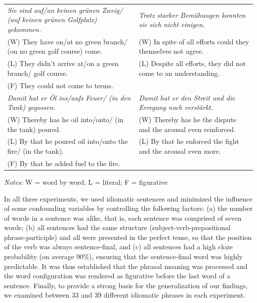 \begin{table}[]
{\begin{tabular}{|p{4in}|p{4in}|}
\textit{Sie sind auf/an keinen grünen Zweig/ (auf keinen grünen Golfplatz) gekommen.} & \textit{Trotz starker Bemühungen konnten sie sich nicht einigen.} \\
\hspace{3mm}(W) They have on/at no green branch/ (on no green golf course) come.                  & \hspace{3mm}(W) In spite of all efforts could they themselves not agree.      \\
\hspace{3mm}(L) They didn’t arrive at/on a green branch/ golf course.                             & \hspace{3mm}(L) Despite all efforts, they did not come to an understanding.   \\
\hspace{3mm}(F) They could not come to terms.                                                     &                                                                   \\ \hline
\textit{Damit hat er Öl ins/aufs Feuer/ (in den Tank) gegossen.}                      & \textit{Damit hat er den Streit und die Erregung noch verstärkt.} \\
\hspace{3mm}(W) Thereby has he oil into/onto/ (in the tank) poured.                               & \hspace{3mm}(W) Thereby has he the dispute and the arousal even reinforced.   \\
\hspace{3mm}(L) By that he poured oil into/onto the fire/ (in the tank).                          & \hspace{3mm}(L) By that he enforced the fight and the arousal even more.      \\
\hspace{3mm}(F) By that he added fuel to the fire.                                                &                                                                   \\ \hline
\end{tabular}}
\footnotesize{\textit{Notes:} W = word by word; L = literal; F = figurative}
\end{table}

In all three experiments, we used idiomatic sentences and minimized the influence of some confounding variables by controlling the following factors: (a) the number of words in a sentence was alike, that is, each sentence was comprised of seven words; (b) all sentences had the same structure (subject-verb-prepositional phrase-participle) and all were presented in the perfect tense, so that the position of the verb was always sentence-final, and (c) all sentences had a high cloze probability (on average 90\%), ensuring that the sentence-final word was highly predictable. It was thus established that the phrasal meaning was processed and the word configuration was rendered as figurative before the last word of a sentence. Finally, to provide a strong basis for the generalization of our findings, we examined between 33 and 39 different idiomatic phrases in each experiment. 



